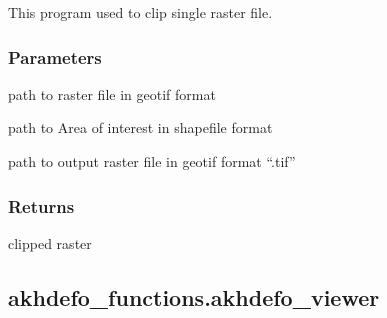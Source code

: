 \documentclass[letterpaper,10pt]{sphinxmanual}
\begin{document}
\begin{fulllineitems}
\label{\detokenize{generated/akhdefo_functions.rasterClip:akhdefo_functions.rasterClip}}
\pysigstartsignatures
{}
\pysigstopsignatures
\sphinxAtStartPar
This program used to clip single raster file.


\subsubsection{Parameters}
\label{\detokenize{generated/akhdefo_functions.rasterClip:parameters}}\begin{description}
\sphinxAtStartPar
path to raster file in geotif format

\sphinxAtStartPar
path to Area of interest in shapefile format

\sphinxAtStartPar
path to output raster file in geotif format “.tif”

\end{description}


\subsubsection{Returns}
\label{\detokenize{generated/akhdefo_functions.rasterClip:returns}}
\sphinxAtStartPar
clipped raster

\end{fulllineitems}


\sphinxstepscope


\subsection{akhdefo\_functions.akhdefo\_viewer}
\label{\detokenize{generated/akhdefo_functions.akhdefo_viewer:akhdefo-functions-akhdefo-viewer}}\label{\detokenize{generated/akhdefo_functions.akhdefo_viewer::doc}}
\end{document}

